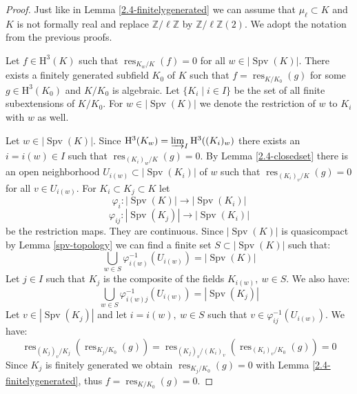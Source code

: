 \begin{proof}
Just like in Lemma \ref{2.4-finitelygenerated} we can assume that $\mu_\ell\subset K$ and $K$ is not formally real and replace $\mathbb{Z}/\ell\mathbb{Z}$ by $\mathbb{Z}/\ell\mathbb{Z}(2)$. We adopt the notation from the previous proofs.

Let $f\in\mathrm{H}^3(K)$ such that $\operatorname{res}_{K_w/K}(f) = 0$ for all $w\in |\operatorname{Spv}(K)|$. There exists a finitely generated subfield $K_0$ of $K$ such that $f = \operatorname{res}_{K/K_0}(g)$ for some $g\in\mathrm{H}^3(K_0)$ and $K/K_0$ is algebraic. Let $\{K_i\mid i\in I\}$ be the set of all finite subextensions of $K/K_0$. For $w\in |\operatorname{Spv}(K)|$ we denote the restriction of $w$ to $K_i$ with $w$ as well.

Let  $w\in |\operatorname{Spv}(K)|$. Since $\mathrm{H}^3(K_w) = \varinjlim_I \mathrm{H}^3((K_i)_w)$ there exists an $i = i(w)\in I$ such that $\operatorname{res}_{(K_i)_w/K}(g) = 0$. By Lemma \ref{2.4-closedset} there is an open neighborhood $U_{i(w)}\subset |\operatorname{Spv}(K_i)|$ of $w$ such that $\operatorname{res}_{(K_i)_v/K}(g)=0$ for all $v\in U_{i(w)}$. For $K_i\subset K_j\subset K$ let
\[ \varphi_i: |\operatorname{Spv}(K)| \to |\operatorname{Spv}(K_i)| \]
\[ \varphi_{ij}: |\operatorname{Spv}(K_j)|\to |\operatorname{Spv}(K_i)| \]
be the restriction maps. They are continuous. Since $|\operatorname{Spv}(K)|$ is quasicompact by Lemma \ref{spv-topology} we can find a finite set $S\subset |\operatorname{Spv}(K)|$ such that:
\[ \bigcup_{w\in S}\varphi^{-1}_{i(w)}(U_{i(w)}) = |\operatorname{Spv}(K)| \]
Let $j\in I$ such that $K_j$ is the composite of the fields $K_{i(w)},\ w\in S$. We also have:
\[ \bigcup_{w\in S}\varphi^{-1}_{i(w)j}(U_{i(w)}) = |\operatorname{Spv}(K_j)| \]
Let $v\in |\operatorname{Spv}(K_j)|$ and let $i = i(w),\ w\in S$ such that $v\in\varphi_{ij}^{-1}(U_{i(w)})$. We have:
\[ \operatorname{res}_{(K_j)_v/K_j}(\operatorname{res}_{K_j/K_0}(g)) = \operatorname{res}_{(K_j)_v/(K_i)_v}(\operatorname{res}_{(K_i)_v/K_0}(g)) = 0 \]
Since $K_j$ is finitely generated we obtain $\operatorname{res}_{K_j/K_0}(g) = 0$ with Lemma \ref{2.4-finitelygenerated}, thus $f = \operatorname{res}_{K/K_0}(g) = 0$.
\end{proof}

